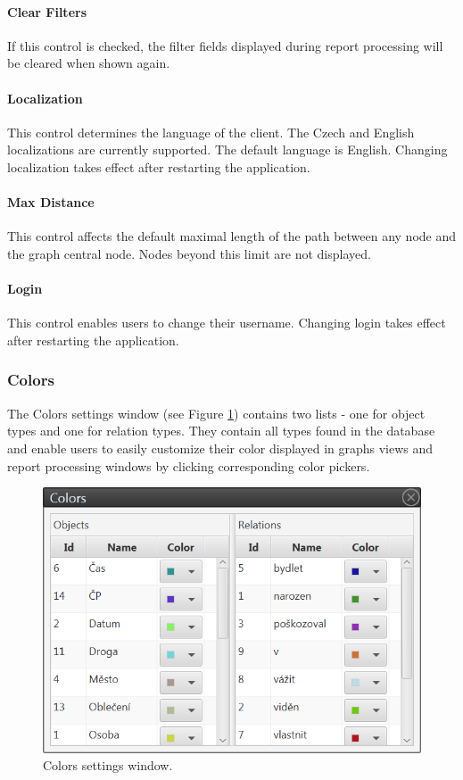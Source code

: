 \paragraph{Clear Filters} If this control is checked, the filter fields
displayed during report processing will be cleared when shown again.

\paragraph{Localization} This control determines the language of the \textan{}
client. The Czech and English localizations are currently supported. The
default language is English. Changing localization takes effect after
restarting the application.

\paragraph{Max Distance} This control affects the default maximal length of the
path between any node and the graph central node. Nodes beyond this limit are
not displayed.

\paragraph{Login} This control enables users to change their username. Changing
login takes effect after restarting the application.

\subsubsection{Colors}
The Colors settings window (see Figure \ref{fig:Colors}) contains two lists -
one for object types and one for relation types. They contain all types found
in the database and enable users to easily customize their color displayed in
graphs views and report processing windows by clicking corresponding color
pickers.

\begin{figure}[!htb]
        \centering
        \includegraphics[width=\textwidth]{Images/colors}
        \caption{Colors settings window.}
        \label{fig:Colors}
\end{figure}

